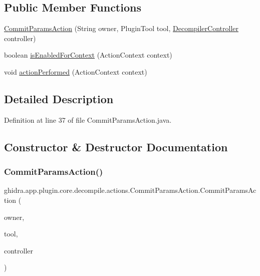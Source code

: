 \subsection*{Public Member Functions}
\begin{DoxyCompactItemize}
\item 
\mbox{\hyperlink{classghidra_1_1app_1_1plugin_1_1core_1_1decompile_1_1actions_1_1_commit_params_action_a6b3862e97a40ac98c1648248a3ebf5b8}{Commit\+Params\+Action}} (String owner, Plugin\+Tool tool, \mbox{\hyperlink{classghidra_1_1app_1_1decompiler_1_1component_1_1_decompiler_controller}{Decompiler\+Controller}} controller)
\item 
boolean \mbox{\hyperlink{classghidra_1_1app_1_1plugin_1_1core_1_1decompile_1_1actions_1_1_commit_params_action_ae5850c15b5241ba5c27bfec0f8ae6485}{is\+Enabled\+For\+Context}} (Action\+Context context)
\item 
void \mbox{\hyperlink{classghidra_1_1app_1_1plugin_1_1core_1_1decompile_1_1actions_1_1_commit_params_action_ad1fe400609ca0c7fa4b09c3771c25c74}{action\+Performed}} (Action\+Context context)
\end{DoxyCompactItemize}


\subsection{Detailed Description}


Definition at line 37 of file Commit\+Params\+Action.\+java.



\subsection{Constructor \& Destructor Documentation}
\mbox{\label{classghidra_1_1app_1_1plugin_1_1core_1_1decompile_1_1actions_1_1_commit_params_action_a6b3862e97a40ac98c1648248a3ebf5b8}} 
\subsubsection{\texorpdfstring{CommitParamsAction()}{CommitParamsAction()}}
{\footnotesize\ttfamily ghidra.\+app.\+plugin.\+core.\+decompile.\+actions.\+Commit\+Params\+Action.\+Commit\+Params\+Action (\begin{DoxyParamCaption}\item[{String}]{owner,  }\item[{Plugin\+Tool}]{tool,  }\item[{\mbox{\hyperlink{classghidra_1_1app_1_1decompiler_1_1component_1_1_decompiler_controller}{Decompiler\+Controller}}}]{controller }\end{DoxyParamCaption})\hspace{0.3cm}{\ttfamily [inline]}}



